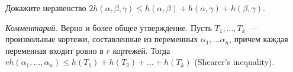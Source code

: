 Докажите неравенство $2 h(\alpha, \beta, \gamma) \le h(\alpha, \beta) + h(\alpha, \gamma) +
h(\beta, \gamma)$.

\textit{Комментарий.} Верно и более общее утверждение. Пусть $T_1, \dots, T_k$~--- произвольные кортежи,
составленные из переменных $\alpha_1, \dots \alpha_n$, причем каждая переменная входит ровно в $r$
кортежей. Тогда $r h(\alpha_1, \dots, \alpha_n) \leq h(T_1) + h(T_2) + \dots + h(T_k)$ (Shearer's
inequality).
